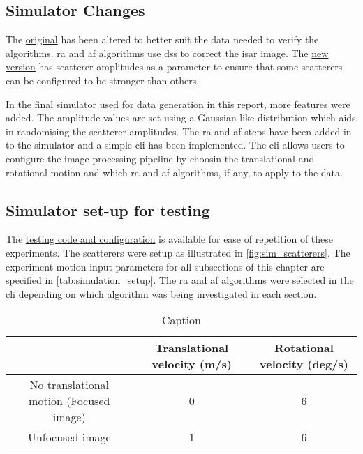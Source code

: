\documentclass[class=report,11pt,crop=false]{standalone}
\begin{document}
    \subsection{Simulator Changes}
    The \href{https://github.com/tristynferreiro/QP4ISAR/blob/main/src/Simulator/Original%20Simulator%20Files/Version_3_object_translation_and_rotation_motion.m}{original} has been altered to better suit the data needed to verify the algorithms. \gls{ra} and \gls{af} algorithms use \gls{ds}s to correct the \gls{isar} image. The \href{https://github.com/tristynferreiro/QP4ISAR/blob/main/src/Simulator/Revised%20Simulator%20Files/Version_3_rev1_object_translation_and_rotation_motion.m}{new version} has scatterer amplitudes as a parameter to ensure that some scatterers can be configured to be stronger than others.
    
    In the \href{https://github.com/tristynferreiro/QP4ISAR/blob/main/src/Simulator/Final_Simulator.m}{final simulator} used for data generation in this report, more features were added. The amplitude values are set using a Gaussian-like distribution which aids in randomising the scatterer amplitudes. The \gls{ra} and \gls{af} steps have been added in to the simulator and a simple \gls{cli} has been implemented. The \gls{cli} allows users to configure the image processing pipeline by choosin the translational and rotational motion and which \gls{ra} and \gls{af} algorithms, if any, to apply to the data. 
    
    \subsection{Simulator set-up for testing} \label{subsec:suimulation_setup}
    The \href{https://github.com/tristynferreiro/QP4ISAR/tree/main/src/Simulator/Testing%20Setup}{testing code and configuration} is available for ease of repetition of these experiments. The scatterers were setup as illustrated in \autoref{fig:sim_scatterers}. The experiment motion input parameters for all subsections of this chapter are specified in \autoref{tab:simulation_setup}. The \gls{ra} and \gls{af} algorithms were selected in the \gls{cli} depending on which algorithm was being investigated in each section.
    
    \begin{table}[ht]
        \centering
        {\small
        \begin{tabular}{|c|c|c|}
            \hline
            & \textbf{Translational velocity (m/s)} & \textbf{Rotational velocity (deg/s)} \\
            \hline
            No translational motion (Focused image) & 0 & 6 \\
            \hline
            Unfocused image & 1 & 6 \\
            \hline
        \end{tabular}
        }
        \caption{Caption}
        \label{tab:simulation_setup}
    \end{table}
\end{document}
